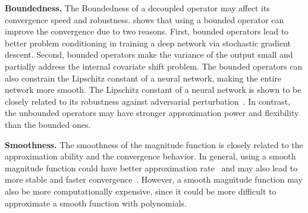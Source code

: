 \textbf{Boundedness.} The Boundedness of a decoupled operator may affect its convergence speed and robustness. \cite{liu2017deephyper} shows that using a bounded operator can improve the convergence due to two reasons. First, bounded operators lead to better problem conditioning in training a deep network via stochastic gradient descent. Second, bounded operators make the variance of the output small and partially address the internal covariate shift problem. The bounded operators can also constrain the Lipschitz constant of a neural network, making the entire network more smooth. The Lipschitz constant of a neural network is shown to be closely related to its robustness against adversarial perturbation~\cite{hein2017formal}. In contrast, the unbounded operators may have stronger approximation power and flexibility than the bounded ones.

\textbf{Smoothness.} The smoothness of the magnitude function is closely related to the approximation ability and the convergence behavior. In general, using a smooth magnitude function could have better approximation rate~\cite{mhaskar1994choose} and may also lead to more stable and faster convergence~\cite{clevert2015fast}. However, a smooth magnitude function may also be more computationally expensive, since it could be more difficult to approximate a smooth function with polynomials.

